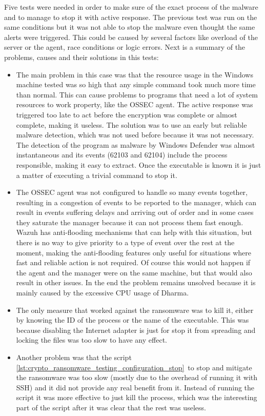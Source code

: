\linej
Five tests were needed in order to make sure of the exact process of the malware and to manage to stop it with active response.
The previous test was run on the same conditions but it was not able to stop the malware even thought the same alerts were triggered.
This could be caused by several factors like overload of the server or the agent, race conditions or logic errors.
\linej
Next is a summary of the problems, causes and their solutions in this tests:
\begin{itemize}
	\item The main problem in this case was that the resource usage in the Windows machine tested was so high that any simple command took much more time than normal.
This can cause problems to programs that need a lot of system resources to work property, like the OSSEC agent.
The active response was triggered too late to act before the encryption was complete or almost complete, making it useless.
\linej
The solution was to use an early but reliable malware detection, which was not used before because it was not necessary.
The detection of the program as malware by Windows Defender was almost instantaneous and its events (62103 and 62104) include the process responsible, making it easy to extract.
Once the executable is known it is just a matter of executing a trivial command to stop it.

	\item The OSSEC agent was not configured to handle so many events together, resulting in a congestion of events to be reported to the manager, which can result in events suffering delays and arriving out of order and in some cases they saturate the manager because it can not process them fast enough.
\linej
Wazuh has anti-flooding mechanisms\cite{antiflooding} that can help with this situation, but there is no way to give priority to a type of event over the rest at the moment, making the anti-flooding features only useful for situations where fast and reliable action is not required.
Of course this would not happen if the agent and the manager were on the same machine, but that would also result in other issues.
In the end the problem remains unsolved because it is mainly caused by the excessive CPU usage of Dharma.

	\item The only measure that worked against the ransomware was to kill it, either by knowing the ID of the process or the name of the executable.
This was because disabling the Internet adapter is just for stop it from spreading and locking the files was too slow to have any effect.

	\item Another problem was that the script \ref{lst:crypto_ransomware_testing_configuration_stop}\ to stop and mitigate the ransomware was too slow (mostly due to the overhead of running it with SSH) and it did not provide any real benefit from it.
\linej
Instead of running the script it was more effective to just kill the process, which was the interesting part of the script after it was clear that the rest was useless.
\end{itemize}
